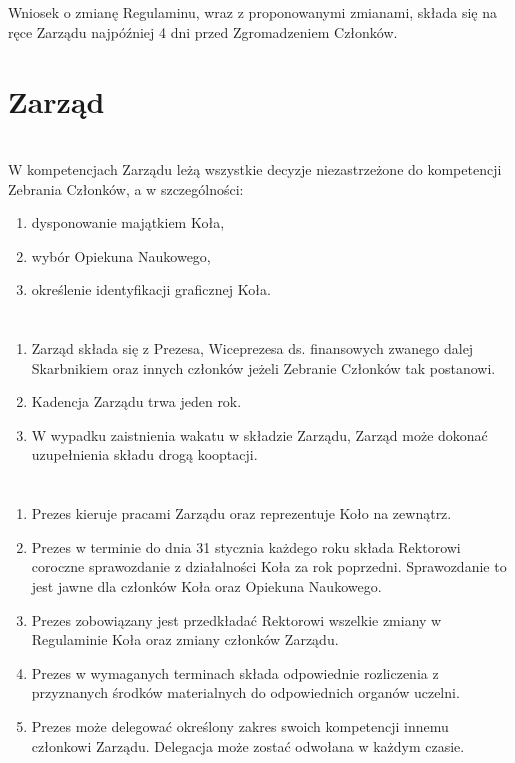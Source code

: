 \section{}
Wniosek o zmianę Regulaminu, wraz z proponowanymi zmianami, składa się na ręce Zarządu najpóźniej 4 dni przed Zgromadzeniem Członków.

\section*{Zarząd~~~}
\section{}
W kompetencjach Zarządu leżą wszystkie decyzje niezastrzeżone do kompetencji Zebrania Członków, a w szczególności:
\begin{enumerate}[label=\alph*)]
\item dysponowanie majątkiem Koła,
\item wybór Opiekuna Naukowego,
\item określenie identyfikacji graficznej Koła.
\end{enumerate}

\section{}
\begin{enumerate}
\item Zarząd składa się z Prezesa, Wiceprezesa ds. finansowych zwanego dalej Skarbnikiem oraz innych członków jeżeli Zebranie Członków tak postanowi.
\item Kadencja Zarządu trwa jeden rok.
\item W wypadku zaistnienia wakatu w składzie Zarządu, Zarząd może dokonać uzupełnienia składu drogą
kooptacji.
\end{enumerate}

\section{}
\begin{enumerate}
\item Prezes kieruje pracami Zarządu oraz reprezentuje Koło na zewnątrz.
\item Prezes w terminie do dnia 31 stycznia każdego roku składa Rektorowi coroczne sprawozdanie z działalności Koła za rok poprzedni. Sprawozdanie to jest jawne dla członków Koła oraz Opiekuna Naukowego.
\item Prezes zobowiązany jest przedkładać Rektorowi wszelkie zmiany w Regulaminie Koła oraz zmiany członków Zarządu.
\item Prezes w wymaganych terminach składa odpowiednie rozliczenia z przyznanych środków materialnych do odpowiednich organów uczelni.
\item Prezes może delegować określony zakres swoich kompetencji innemu członkowi Zarządu. Delegacja może zostać odwołana w każdym czasie.
\end{enumerate}

